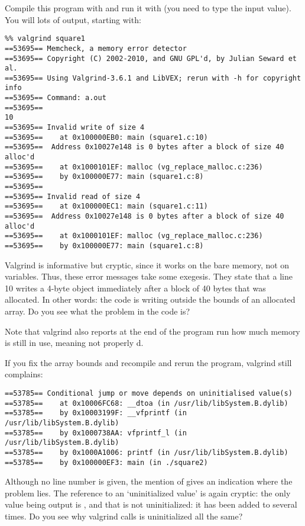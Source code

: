 %
Compile this program with  and run it with
 (you need to type the input value). You will lots
of output, starting with:
{\small
\begin{verbatim}
%% valgrind square1
==53695== Memcheck, a memory error detector
==53695== Copyright (C) 2002-2010, and GNU GPL'd, by Julian Seward et al.
==53695== Using Valgrind-3.6.1 and LibVEX; rerun with -h for copyright info
==53695== Command: a.out
==53695== 
10
==53695== Invalid write of size 4
==53695==    at 0x100000EB0: main (square1.c:10)
==53695==  Address 0x10027e148 is 0 bytes after a block of size 40 alloc'd
==53695==    at 0x1000101EF: malloc (vg_replace_malloc.c:236)
==53695==    by 0x100000E77: main (square1.c:8)
==53695== 
==53695== Invalid read of size 4
==53695==    at 0x100000EC1: main (square1.c:11)
==53695==  Address 0x10027e148 is 0 bytes after a block of size 40 alloc'd
==53695==    at 0x1000101EF: malloc (vg_replace_malloc.c:236)
==53695==    by 0x100000E77: main (square1.c:8)
\end{verbatim}
}
Valgrind is informative but cryptic, since it works on the bare
memory, not on variables. Thus, these error messages take some
exegesis. They state that a line 10 writes a 4-byte object immediately
after a block of 40 bytes that was allocated. In other words: the code
is writing outside the bounds of an allocated array. Do you see what
the problem in the code is?

Note that valgrind also reports at the end of the program run how much
memory is still in use, meaning not properly d.

If you fix the array bounds and recompile and rerun the program,
valgrind still complains:
{\small
\begin{verbatim}
==53785== Conditional jump or move depends on uninitialised value(s)
==53785==    at 0x10006FC68: __dtoa (in /usr/lib/libSystem.B.dylib)
==53785==    by 0x10003199F: __vfprintf (in /usr/lib/libSystem.B.dylib)
==53785==    by 0x1000738AA: vfprintf_l (in /usr/lib/libSystem.B.dylib)
==53785==    by 0x1000A1006: printf (in /usr/lib/libSystem.B.dylib)
==53785==    by 0x100000EF3: main (in ./square2)
\end{verbatim}
}
Although no line number is given, the mention of  gives an
indication where the problem lies.
The reference to an `uninitialized value' is again cryptic: the only
value being output is , and that is not uninitialized: it has
been added to several times. Do you see why valgrind calls is
uninitialized all the same?

